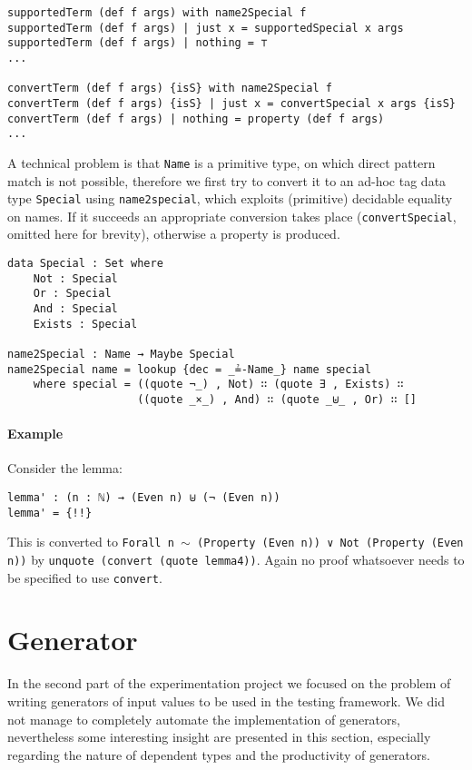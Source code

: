 \documentclass[10pt,a4paper]{article}
\begin{document}
\begin{verbatim}
supportedTerm (def f args) with name2Special f
supportedTerm (def f args) | just x = supportedSpecial x args
supportedTerm (def f args) | nothing = ⊤
...

convertTerm (def f args) {isS} with name2Special f
convertTerm (def f args) {isS} | just x = convertSpecial x args {isS}
convertTerm (def f args) | nothing = property (def f args)
...
\end{verbatim}

A technical problem is that \texttt{Name} is a primitive type, on which direct pattern match is not possible, therefore we first try to convert it to an ad-hoc tag data type \texttt{Special} using \texttt{name2special}, which exploits (primitive) decidable equality on names. If it succeeds an appropriate conversion takes place (\texttt{convertSpecial}, omitted here for brevity), otherwise a property is produced.

\begin{verbatim}
data Special : Set where
    Not : Special
    Or : Special
    And : Special
    Exists : Special

name2Special : Name → Maybe Special
name2Special name = lookup {dec = _≟-Name_} name special
    where special = ((quote ¬_) , Not) ∷ (quote ∃ , Exists) ∷ 
                    ((quote _×_) , And) ∷ (quote _⊎_ , Or) ∷ [] 
\end{verbatim}

\paragraph{Example}
Consider the lemma:
\begin{verbatim}
lemma' : (n : ℕ) → (Even n) ⊎ (¬ (Even n))
lemma' = {!!}
\end{verbatim}
This is converted to \texttt{Forall n $\sim$ (Property (Even n)) ∨ Not (Property (Even n))} by  \texttt{unquote (convert (quote lemma4))}. Again no proof whatsoever needs to be specified to use \texttt{convert}.

\section{Generator}
In the second part of the experimentation project we focused on the problem of writing generators of input values to be used in the testing framework.
We did not manage to completely automate the implementation of generators, nevertheless some interesting insight are presented in this section, especially regarding the nature of dependent types and the productivity of generators.
\end{document}

